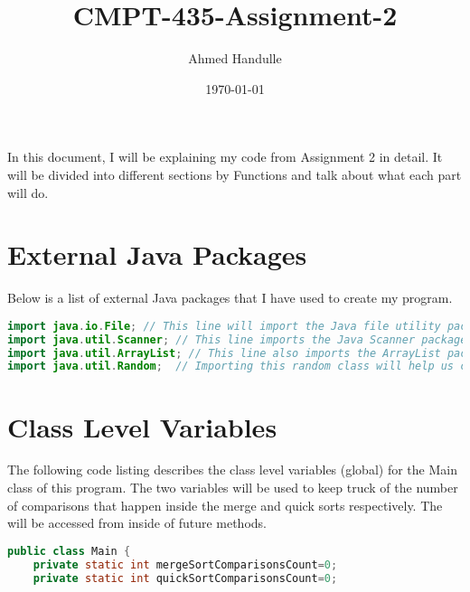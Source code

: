 \documentclass{article}
\title{CMPT-435-Assignment-2}
\date{\today}
\author{Ahmed Handulle}
\begin{document}
\maketitle
In this document, I will be explaining my code from Assignment 2 in detail. It will be divided into different sections by Functions and talk about what each part will do. 
\section{External Java Packages}
Below is a list of external Java packages that I have used to create my program.
\begin{lstlisting}[language=Java]
import java.io.File; // This line will import the Java file utility package and it will give us access to other files in our computer. We will also use it to read data from as well as writing data to those files. 
import java.util.Scanner; // This line imports the Java Scanner package which is a text scanner that can parse data (strings/numbers) using regular expressions. 
import java.util.ArrayList; // This line also imports the ArrayList package which will give us many functionalities of dynamic arrays in Java. 
import java.util.Random;  // Importing this random class will help us create objects of the Random class to generate random numbers.

\end{lstlisting}
\section{Class Level Variables}
The following code listing describes the class level variables (global) for the Main class of this program. The two variables will be used to keep truck of the number of comparisons that happen inside the merge and quick sorts respectively. The will be accessed from inside of future methods. 
\begin{lstlisting}[language=Java]
public class Main {
    private static int mergeSortComparisonsCount=0;
    private static int quickSortComparisonsCount=0;

\end{lstlisting}
\clearpage
\end{document}
